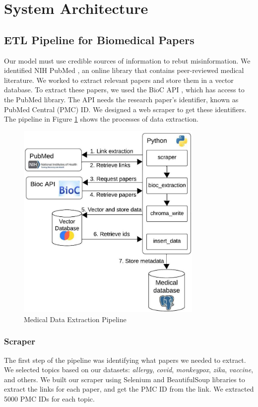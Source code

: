 
\section{System Architecture}

\subsection{ETL Pipeline for Biomedical Papers}

Our model must use credible sources of information to rebut misinformation. We identified NIH PubMed \cite{pubmed}, an online library that contains peer-reviewed medical literature. We worked to extract relevant papers and store them in a vector database. To extract these papers, we used the BioC API \cite{bioinformatics}, which has access to the PubMed library. The API needs the research paper's identifier, known as PubMed Central (PMC) ID. We designed a web scraper to get these identifiers. The pipeline in Figure \ref{fig:etl} shows the processes of data extraction. 

\begin{figure}[!htb]
	\begin{center}
		\includegraphics[width=0.8\textwidth]{figures/ETL_Pipeline.jpeg}
	\end{center}
	\caption{Medical Data Extraction Pipeline} 
	\label{fig:etl}
\end{figure}

\subsubsection{Scraper}
The first step of the pipeline was identifying what papers we needed to extract. We selected topics based on our datasets: \textit{allergy}, \textit{covid}, \textit{monkeypox}, \textit{zika}, \textit{vaccine}, and others. We built our scraper using Selenium and BeautifulSoup libraries to extract the links for each paper, and get the PMC ID  from the link.  We extracted 5000 PMC IDs for each topic.

